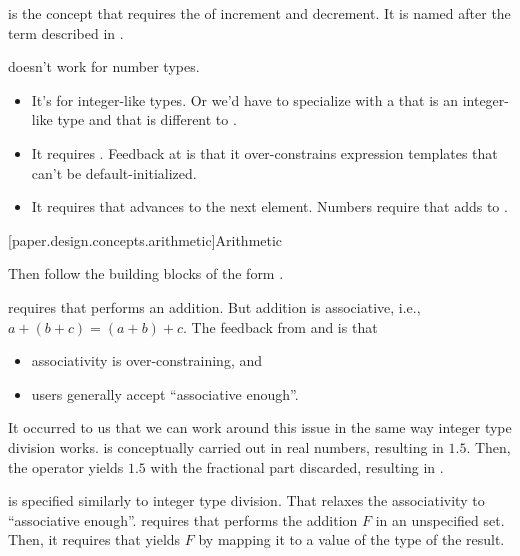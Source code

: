 \pnum
{} is the concept that requires the  of increment and decrement.
It is named after the term described in .
\begin{note}
 doesn't work for number types.
\begin{itemize}
\item
It's for integer-like types.
Or we'd have to specialize 
with a  that is an integer-like type
and that is different to .
\item
It requires .
Feedback at \hrefVII{} is that it over-constrains expression templates that can't be default-initialized.
\item
It requires that  advances  to the next element.
Numbers require that  adds  to .
\end{itemize}
\end{note}

[paper.design.concepts.arithmetic]{Arithmetic}

\pnum
Then follow the building blocks of the form .

\pnum
{} requires that \tcode{+} performs an addition.
But addition is associative, i.e., $a + (b + c) = (a + b) + c$.
The feedback from  and \hrefVI{} is that
\begin{itemize}
\item associativity is over-constraining, and
\item users generally accept ``associative enough''.
\end{itemize}

\pnum
It occurred to us that we can work around this issue in the same way integer type division works.
 is conceptually carried out in real numbers, resulting in $1.5$.
Then, the operator \tcode{/} yields $1.5$ with the fractional part discarded, resulting in .

\pnum
{} is specified similarly to integer type division.
That relaxes the associativity to ``associative enough''.
 requires that  performs the addition $F$ in an unspecified set.
Then, it requires that \tcode{+} yields $F$ by mapping it to a value of the type of the result.


